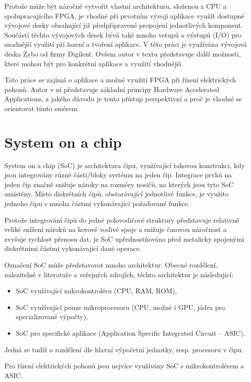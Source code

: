 \documentclass[a4paper, twoside, 11pt]{article}
\begin{document}
Protože může být náročné vytvořit vlastní architekturu, složenou z CPU a spolupracujícího FPGA, je vhodné při prvotním vývoji aplikace využít dostupné vývojové desky obsahující již předpřipravené propojení jednotlivých komponent. Součástí těchto vývojových desek bývá také mnoho vstupů a výstupů (I/O) pro snadnější využití při lazení a tvoření aplikace. V této práci je využívána vývojová deska Zybo od firmy Digilent. Ovšem autor v textu představuje další možnosti, které mohou být pro konkrétní aplikace a využití vhodnější.\par
Tato práce se zajímá o aplikace a možné využití FPGA při řízení elektrických pohonů. Autor v ní představuje základní principy Hardware Accelerated Applications, z jakého důvodu je tento přístup perspektivní a proč je vhodné se orientovat tímto směrem.\par
\flushbottom %
\newpage

	\section{System on a chip}
	System on a chip (SoC) je architektura čipu, využívající takovou konstrukci, kdy jsou integrovány různé části/bloky systému na jeden čip. Integrace prvků na jeden čip značně snižuje nároky na rozměry nosičů, na kterých jsou tyto SoC umístěny. Místo diskrétních čipů, obstarávající jednotlivé funkce, je využito jednoho čipu s mnoha částmi vykonávající požadované funkce.\par
	Protože integrování čipů do jedné polovodičové struktury představuje relativně veliké snížení nároků na kovové vodivé spoje a snižuje časovou náročnost a zvyšuje rychlost přenosu dat, je SoC upřednostňováno před metalicky spojenými diskrétními částmi vykonávající dané operace.\par
	Označení SoC může představovat mnoho architektur. Obecné rozdělení, nalezitelné v literatuře a veřejných zdrojích, těchto architektur je následující:
	\begin{itemize}
		\item SoC využívající mikrokontroléru (CPU, RAM, ROM),
		\item SoC využívající pouze mikroprocesoru (CPU, možné i GPU, jádra pro specializované výpočty),
		\item SoC pro specifické aplikace (Application Specific Integrated Circuit – ASIC).
	\end{itemize}
	Jedná se tudíž o rozdělení dle hlavní výpočetní jednotky, resp. procesoru v čipu. \cite{tomshardware-system-on-chip}\par
	Pro řízení elektrických pohonů jsou nejvíce využívány SoC s mikrokontrolérem a ASIC.
\end{document}
